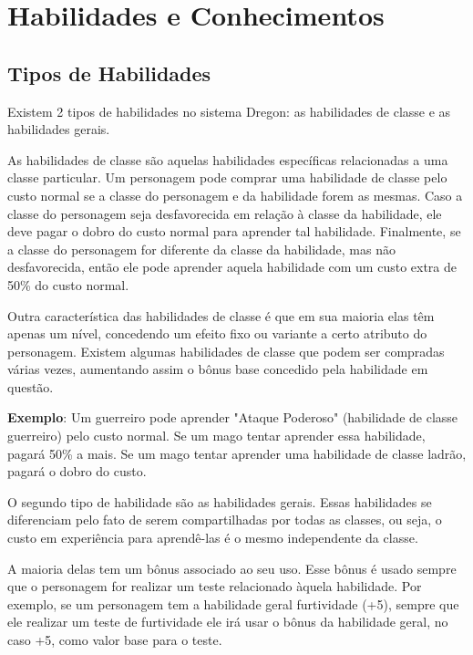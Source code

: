 
\chapter{Habilidades e Conhecimentos}
\label{Cap:Habilidades}

\section{Tipos de Habilidades}

Existem 2 tipos de habilidades no sistema Dregon: as habilidades de classe e as habilidades gerais. 

As habilidades de classe são aquelas habilidades específicas relacionadas a uma classe particular. Um personagem pode comprar uma habilidade de classe pelo custo normal se a classe do personagem e da habilidade forem as mesmas. Caso a classe do personagem seja desfavorecida em relação à classe da habilidade, ele deve pagar o dobro do custo normal para aprender tal habilidade. Finalmente, se a classe do personagem for diferente da classe da habilidade, mas não desfavorecida, então ele pode aprender aquela habilidade com um custo extra de 50\% do custo normal. 

Outra característica das habilidades de classe é que em sua maioria elas têm apenas um nível, concedendo um efeito fixo ou variante a certo atributo do personagem. Existem algumas habilidades de classe que podem ser compradas várias vezes, aumentando assim o bônus base concedido pela habilidade em questão.

\textbf{Exemplo}: Um guerreiro pode aprender "Ataque Poderoso" (habilidade de classe guerreiro) pelo custo normal. Se um mago tentar aprender essa habilidade, pagará 50\% a mais. Se um mago tentar aprender uma habilidade de classe ladrão, pagará o dobro do custo.

O segundo tipo de habilidade são as habilidades gerais. Essas habilidades se diferenciam pelo fato de serem compartilhadas por todas as classes, ou seja, o custo em experiência para aprendê-las é o mesmo independente da classe. 

A maioria delas tem um bônus associado ao seu uso. Esse bônus é usado sempre que o personagem for realizar um teste relacionado àquela habilidade. Por exemplo, se um personagem tem a habilidade geral furtividade (+5), sempre que ele realizar um teste de furtividade ele irá usar o bônus da habilidade geral, no caso +5, como valor base para o teste. 

